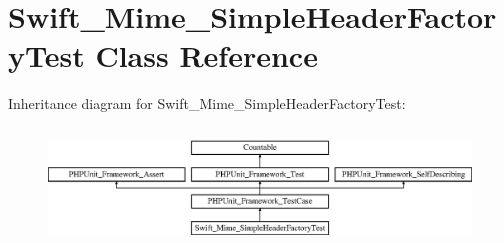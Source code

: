 \section{Swift\+\_\+\+Mime\+\_\+\+Simple\+Header\+Factory\+Test Class Reference}
\label{class_swift___mime___simple_header_factory_test}
Inheritance diagram for Swift\+\_\+\+Mime\+\_\+\+Simple\+Header\+Factory\+Test\+:\begin{figure}[H]
\begin{center}
\leavevmode
\includegraphics[height=3.150492cm]{class_swift___mime___simple_header_factory_test}
\end{center}
\end{figure}
